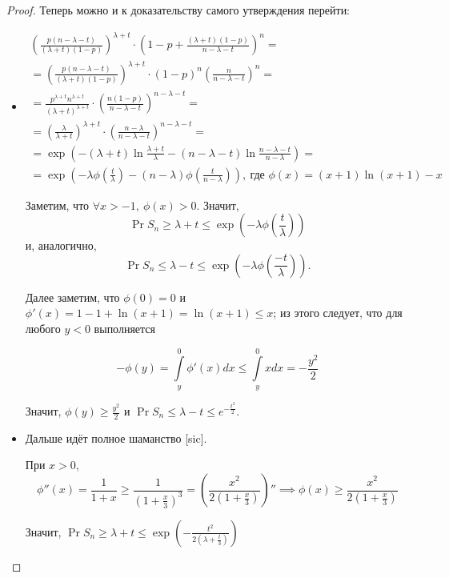 \begin{proof}
    Теперь можно и к доказательству самого утверждения перейти:
    \newcommand*\circled[1]{\tikz[baseline=(char.base)]{\node[shape=circle,draw,inner sep=1pt] (char) {#1};}}
    \begin{itemize}
        \item \circled{$\leq$}
        \begin{multline*}
            \left(\frac{p(n-\lambda-t)}{(\lambda+t)(1-p)}\right)^{\lambda + t}\cdot
            \left(1-p+\frac{(\lambda+t)(1-p)}{n-\lambda-t}\right)^n =\\=
            \left(\frac{p(n-\lambda-t)}{(\lambda+t)(1-p)}\right)^{\lambda + t}\cdot
            (1-p)^n\left(\frac{n}{n-\lambda-t}\right)^n =\\=
            \frac{p^{\lambda+t}n^{\lambda+t}}{(\lambda+t)^{\lambda+t}}\cdot
            \left(\frac{n(1-p)}{n-\lambda-t}\right)^{n-\lambda-t} =\\=
            \left(\frac{\lambda}{\lambda+t}\right)^{\lambda+t}\cdot
            \left(\frac{n-\lambda}{n-\lambda-t}\right)^{n-\lambda-t} =\\=
            \exp\left( -(\lambda+t)\ln\frac{\lambda+t}{\lambda}
            -(n-\lambda-t)\ln\frac{n-\lambda-t}{n-\lambda}\right) =\\=
            \exp\left( -\lambda\phi\left( \frac{t}{\lambda} \right) - (n-\lambda)\phi\left(
            \frac{t}{n-\lambda}
            \right) \right),\ \text{где $\phi(x)=(x+1)\ln(x+1)-x$}
        \end{multline*}
        
        Заметим, что $\forall x > -1,\ \phi(x)>0$. Значит,
        \[
        \Pr{S_n \geq \lambda + t} \leq \exp\left(-\lambda\phi\left( \frac{t}{\lambda} \right) \right)
        \]
        и, аналогично,
        \[
        \Pr{S_n \leq \lambda - t} \leq \exp\left(-\lambda\phi\left( \frac{-t}{\lambda} \right)
        \right).
        \]
        
        Далее заметим, что $\phi(0) = 0$ и $\phi'(x) = 1 - 1 + \ln(x+1) = \ln(x+1) \leq x$; из этого
        следует, что для любого $y < 0$ выполняется
        
        \[
        -\phi(y) = \int\limits_y^0 \phi'(x)dx \leq \int\limits_y^0xdx = -\frac{y^2}{2}
        \]
        
        Значит, $\phi(y) \geq \frac{y^2}{2}$ и $\Pr{S_n \leq \lambda - t} \leq e^{-\frac{t^2}{2}}$.
        
        \item \circled{$\geq$}
        
        Дальше идёт полное шаманство [sic].
        
        При $x>0$,
        \[
        \phi''(x) = \frac{1}{1+x} \geq \frac{1}{\left( 1+\frac{x}{3} \right)^3} = \left(
        \frac{x^2}{2\left( 1+\frac{x}{3} \right)} \right)'' \implies
        \phi(x) \geq \frac{x^2}{2\left( 1+\frac{x}{3} \right)}
        \]
        
        Значит, $\Pr{S_n \geq \lambda + t} \leq \exp\left( -\frac{t^2}{2\left( \lambda+\frac{t}{3} \right)} \right)$
    \end{itemize}
\end{proof}

